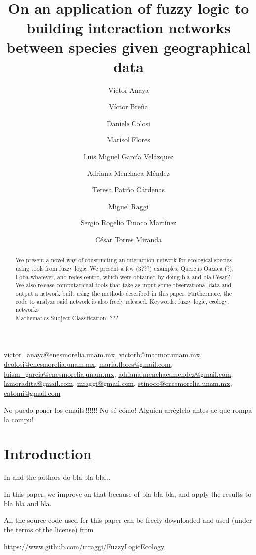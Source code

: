 \documentclass[12pt]{article}
\title{On an application of fuzzy logic to building interaction networks between species given geographical data}
\author[1]{Víctor Anaya}
\author[2]{Víctor Breña}
\author[1]{Daniele Colosi}
\author[1]{Marisol Flores}
\author[1]{Luis Miguel García Velázquez}
\author[1]{Adriana Menchaca Méndez}
\author[2]{Teresa Patiño Cárdenas}
\author[1]{Miguel Raggi}
\author[1]{Sergio Rogelio Tinoco Martínez}
\author[1]{César Torres Miranda}
\affil[1]{Escuela Nacional de Estudios Superiores, Unidad Morelia, UNAM}
\affil[2]{Centro de Ciencias Matemáticas, UNAM}
\numberwithin{equation}{section} %
\numberwithin{figure}{section} %
\theoremstyle{definition}
\def\tcr#1{\textcolor{MyRed}{#1}}
\begin{document}
\maketitle

\href{mailto:victor_anaya@enesmorelia.unam.mx}{victor\_anaya@enesmorelia.unam.mx}, \href{mailto:victorb@matmor.unam.mx}{victorb@matmor.unam.mx}, \href{mailto:dcolosi@enesmorelia.unam.mx}{dcolosi@enesmorelia.unam.mx}, \href{mailto:maria.flores@gmail.com}{maria.flores@gmail.com}, \href{mailto:luism\_garcia@enesmorelia.unam.mx}{luism\_garcia@enesmorelia.unam.mx}, \href{mailto:adriana.menchacamendez@gmail.com}{adriana.menchacamendez@gmail.com}, \href{mailto:lamoradita@gmail.com}{lamoradita@gmail.com}. \href{mailto:mraggi@gmail.com}{mraggi@gmail.com}, \href{mailto:stinoco@enesmorelia.unam.mx}{stinoco@enesmorelia.unam.mx}, \href{mailto:catomi@gmail.com}{catomi@gmail.com}

\tcr{No puedo poner los emails!!!!!!! No sé cómo! Alguien arréglelo antes de que rompa la compu!}
\begin{abstract}
	We present a novel way of constructing an interaction network for ecological species using tools from fuzzy logic. We present a few (3???) examples: Quercus Oaxaca (?), Loba-whatever, and redes centro, which were obtained by doing bla and bla \tcr{César?}. We also release computational tools that take as input some observational data and output a network built using the methods described in this paper. Furthermore, the code to analyze said network is also freely released.
	\vspace{5pt}
Keywords: fuzzy logic, ecology, networks\\
 {\small Mathematics Subject Classification: ???} 
\end{abstract}

\section{Introduction}

In \cite{Hola} and \cite{cesarthesis} the authors do bla bla bla...

In this paper, we improve on that because of bla bla bla, and apply the results to bla bla and bla.

All the source code used for this paper can be freely downloaded and used (under the terms of the license) from
\begin{center}
	\url{https://www.github.com/mraggi/FuzzyLogicEcology}
\end{center}
\end{document}

